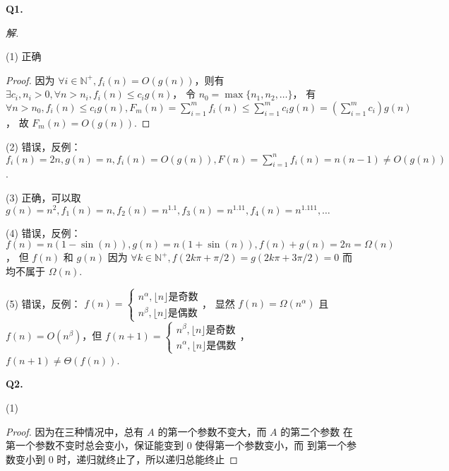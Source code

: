 \documentclass[UTF8]{ctexart}
\begin{document}
\textbf{Q1.}

\textit{解.}

(1) 正确
\begin{proof}
    因为 $\forall i\in\mathbb{N}^+,f_i(n)=O(g(n))$，则有
    $\exists c_i,n_i>0,\forall n>n_i,f_i(n)\leqslant c_{i}g(n)$，
    令 $n_0=\max\{n_1,n_2,\ldots\}$，
    有 $\forall n>n_0,f_i(n)\leqslant c_{i}g(n),F_m(n)=\sum_{i=1}^{m}f_i(n)\leqslant\sum_{i=1}^{m}c_{i}g(n)=\left(\sum_{i=1}^{m}c_{i}\right)g(n)$，
    故 $F_m(n)=O(g(n))$.
\end{proof}

(2) 错误，反例： $f_i(n)=2n,g(n)=n,f_i(n)=O(g(n)),F(n)=\sum_{i=1}^{n}f_i(n)=n(n-1)\neq O(g(n))$.

(3) 正确，可以取 $g(n)=n^2,f_1(n)=n,f_2(n)=n^{1.1},f_3(n)=n^{1.11},f_4(n)=n^{1.111},\ldots$

(4) 错误，反例： $f(n)=n(1-\sin(n)),g(n)=n(1+\sin(n)),f(n)+g(n)=2n=\Omega(n)$，
但 $f(n)$ 和 $g(n)$ 因为 $\forall k\in\mathbb{N}^+,f(2k\pi+\pi/2)=g(2k\pi+3\pi/2)=0$ 而
均不属于 $\Omega(n)$.

(5) 错误，反例： $f(n)=\begin{cases}n^{\alpha},\lfloor n\rfloor\mbox{是奇数}\\n^{\beta},\lfloor n\rfloor\mbox{是偶数}\end{cases}$，
显然 $f(n)=\Omega(n^{\alpha})$ 且 $f(n)=O(n^{\beta})$，但 $f(n+1)=\begin{cases}n^{\beta},\lfloor n\rfloor\mbox{是奇数}\\n^{\alpha},\lfloor n\rfloor\mbox{是偶数}\end{cases}$，
$f(n+1)\neq\Theta(f(n))$.

\hrulefill\medskip

\textbf{Q2.}

(1) \begin{proof}
    因为在三种情况中，总有 $A$ 的第一个参数不变大，而 $A$ 的第二个参数
    在第一个参数不变时总会变小，保证能变到 $0$ 使得第一个参数变小，而
    到第一个参数变小到 $0$ 时，递归就终止了，所以递归总能终止
\end{proof}
\end{document}
